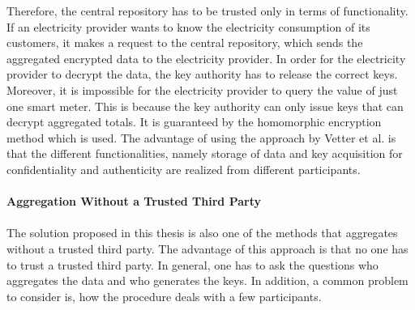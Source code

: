 Therefore, the central repository has to be trusted only in terms of functionality. If an electricity provider wants to know the electricity consumption of its customers, it makes a request to the central repository, which sends the aggregated encrypted data to the electricity provider. In order for the electricity provider to decrypt the data, the key authority has to release the correct keys. Moreover, it is impossible for the electricity provider to query the value of just one smart meter. This is because the key authority can only issue keys that can decrypt aggregated totals. It is guaranteed by the homomorphic encryption method which is used. The advantage of using the approach by Vetter et al. is that the different functionalities, namely storage of data and key acquisition for confidentiality and authenticity are realized from different participants.
\\
\\
\textbf{Aggregation Without a Trusted Third Party}
\\
\\
The solution proposed in this thesis is also one of the methods that aggregates without a trusted third party. The advantage of this approach is that no one has to trust a trusted third party. In general, one has to ask the questions who aggregates the data and who generates the keys. In addition, a common problem to consider is, how the procedure deals with a few participants. \\
